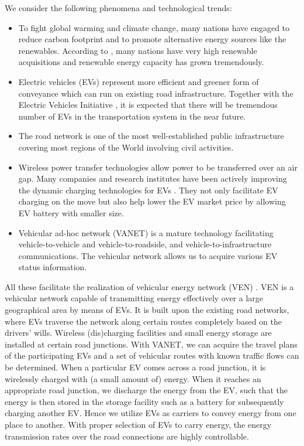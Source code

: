 \documentclass[journal]{IEEEtran}
\begin{document}
We consider the following phenomena and technological trends:
\begin{itemize}
\item To fight global warming and climate change, many nations have engaged to reduce carbon footprint and to promote alternative energy sources like the renewables. According to \cite{REN21}, many nations have very high renewable acquisitions and renewable energy capacity has grown tremendously.   
\item Electric vehicles (EVs) represent more efficient and greener form of conveyance which can run on existing road infrastructure. Together with the Electric Vehicles Initiative \cite{EVI}, it is expected that there will be tremendous number of EVs in the transportation system in the near future. 
\item The road network is one of the most well-established public infrastructure covering most regions of the World involving civil activities.  
\item Wireless power transfer technologies allow power to be transferred over an air gap. Many companies and research institutes have been actively improving the dynamic charging technologies for EVs \cite{qualcomm,stanford}. They not only facilitate EV charging on the move but also help lower the EV market price by allowing EV battery with smaller size. 
\item Vehicular ad-hoc network (VANET) is a mature technology facilitating vehicle-to-vehicle and vehicle-to-roadside, and vehicle-to-infrastructure communications. The vehicular network allows us to acquire various EV status information. 
\end{itemize}
All these facilitate the realization of vehicular energy network (VEN) \cite{VEN}. VEN is a vehicular network capable of transmitting energy effectively over a large geographical area by means of EVs. It is built upon the existing  road networks, where EVs traverse the network along certain routes completely based on the drivers' wills.  Wireless (dis)charging facilities and small energy storage are installed at certain road junctions. With VANET, we can acquire the travel plans of the participating EVs and a set of vehicular routes with known traffic flows can be determined. When a particular EV comes across a road junction, it is  wirelessly charged with (a small amount of) energy. When it reaches an appropriate road junction, we discharge the energy from the EV, such that the energy is then stored in the storage facility such as a battery for subsequently charging another EV. Hence we utilize EVs as carriers to convey energy from one place to another. With proper selection of EVs to carry energy, the energy transmission rates over the road connections are highly controllable. 
\end{document}
